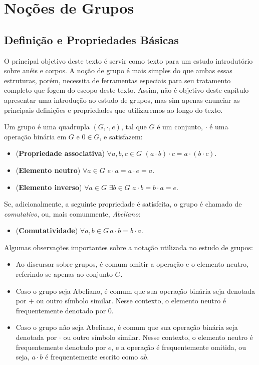 \chapter{Noções de Grupos}


\section{Definição e Propriedades Básicas}

O principal objetivo deste texto é servir como texto para um estudo introdutório sobre anéis e corpos.
A noção de grupo é mais simples do que ambas essas estruturas, porém, necessita de ferramentas especiais para seu tratamento completo que fogem do escopo deste texto.
Assim, não é objetivo deste capítulo apresentar uma introdução ao estudo de grupos, mas sim apenas enunciar as principais definições e propriedades que utilizaremos ao longo do texto.

\begin{definition}
Um grupo é uma quadrupla $(G,\cdot,e)$, tal que $G$ é um conjunto, $\cdot$ é uma operação binária em $G$ e $0 \in G$, e satisfazem:

\begin{itemize}
    \item (\textbf{Propriedade associativa}) $\forall a, b, c \in G$ $(a \cdot b) \cdot c = a \cdot (b \cdot c)$.
    \item (\textbf{Elemento neutro}) $\forall a \in G$  $e \cdot a = a \cdot e = a$.
    \item (\textbf{Elemento inverso}) $\forall a \in G$ $\exists b \in G$ $a \cdot b = b \cdot a = e$.
\end{itemize}
Se, adicionalmente, a seguinte propriedade é satisfeita, o grupo é chamado de \emph{comutativo}, ou, mais comunmente, \emph{Abeliano}:
\begin{itemize}
    \item (\textbf{Comutatividade}) $\forall a, b \in G\, a \cdot b = b \cdot a$.
\end{itemize}
\end{definition}
Algumas observações importantes sobre a notação utilizada no estudo de grupos:
\begin{itemize}
\item Ao discursar sobre grupos, é comum omitir a operação e o elemento neutro, referindo-se apenas ao conjunto $G$.
\item Caso o grupo seja Abeliano, é comum que sua operação binária seja denotada por $+$ ou outro símbolo similar.
Nesse contexto, o elemento neutro é frequentemente denotado por $0$.
\item Caso o grupo não seja Abeliano, é comum que sua operação binária seja denotada por $\cdot$ ou outro símbolo similar.
Nesse contexto, o elemento neutro é frequentemente denotado por $e$, e a operação é frequentemente omitida, ou seja, $a \cdot b$ é frequentemente escrito como $ab$.
\end{itemize}

